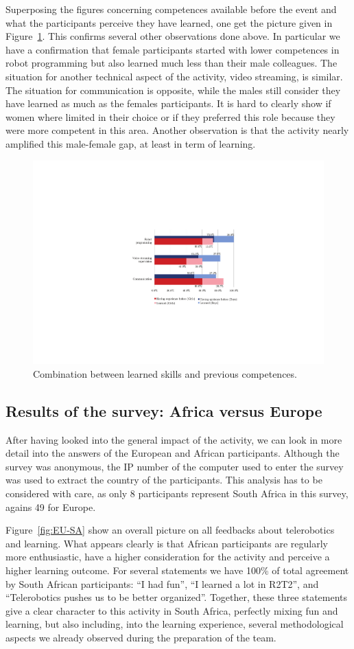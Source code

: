 \documentclass{intech-journal}
\begin{document}
Superposing the figures concerning competences available before the event and what the participants perceive they have learned, one get the picture given in Figure~\ref{fig:learned}.
This confirms several other observations done above.
In particular we have a confirmation that female participants started with lower competences in robot programming but also learned much less than their male colleagues. 
The situation for another technical aspect of the activity, video streaming, is similar. 
The situation for communication is opposite, while the males still consider they have learned as much as the females participants. 
It is hard to clearly show if women where limited in their choice or if they preferred this role because they were more competent in this area. 
Another observation is that the activity nearly amplified this male-female gap, at least in term of learning. 


\begin{figure}[ht]
 \centering
    \includegraphics[width=0.6\columnwidth]{figures/learned.pdf}
  \caption{Combination between learned skills and previous competences.}
  \label{fig:learned} 
\end{figure}

\subsection{Results of the survey: Africa versus Europe}

After having looked into the general impact of the activity, we can look in more detail into the answers of the European and African participants. 
Although the survey was anonymous, the IP number of the computer used to enter the survey was used to extract the country of the participants.
This analysis has to be considered with care, as only 8 participants represent South Africa in this survey, agains 49 for Europe.


Figure~\ref{fig:EU-SA} show an overall picture on all feedbacks about telerobotics and learning.
What appears clearly is that African participants are regularly more enthusiastic, have a higher consideration for the activity and perceive a higher learning outcome. 
For several statements we have 100\% of total agreement by South African participants: ``I had fun'', ``I learned a lot in R2T2'', and ``Telerobotics pushes us to be better organized''.
Together, these three statements give a clear character to this activity in South Africa, perfectly mixing fun and learning, but also including, into the learning experience, several methodological aspects we already observed during the preparation of the team. 
\end{document}

